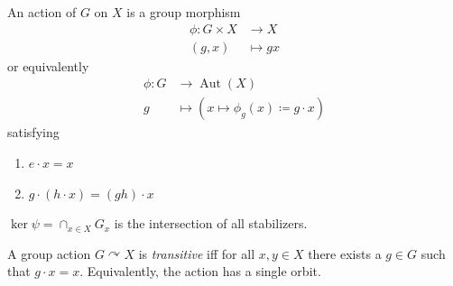 \begin{definition}

An action of \(G\) on \(X\) is a group morphism
\begin{align*}
\phi:G \times X &\rightarrow X \\ 
(g,x) &\mapsto g x
\end{align*}
or equivalently
\begin{align*}
\phi: G &\to {\operatorname{Aut}}(X) \\
g &\mapsto (x \mapsto \phi_g (x) \coloneqq g\cdot x)
\end{align*}
satisfying

\begin{enumerate}
\def\labelenumi{\arabic{enumi}.}
\tightlist
\item
  \(e\cdot x = x\)
\item
  \(g\cdot (h\cdot x) = (gh)\cdot x\)
\end{enumerate}

\end{definition}

\begin{fact}

\(\ker \psi = \cap_{x\in X} G_x\) is the intersection of all
stabilizers.

\end{fact}

\begin{definition}

A group action \(G\curvearrowright X\) is \emph{transitive} iff for all
\(x, y\in X\) there exists a \(g\in G\) such that \(g\cdot x = x\).
Equivalently, the action has a single orbit.

\end{definition}

